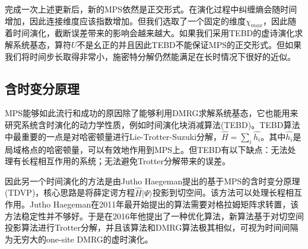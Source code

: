 \documentclass[12pt]{article}
\begin{document}
     完成一次上述更新后，新的MPS依然是正交形式。在演化过程中纠缠熵会随时间增加，因此连接维度应该指数增加。但我们选取了一个固定的维度$\chi_{max}$，因此随着时间演化，截断误差带来的影响会越来越大。如果我们采用TEBD的虚诗演化求解系统基态，算符$U$不是幺正的并且因此TEBD不能保证MPS的正交形式。但如果我们将时间步长取得非常小，施密特分解仍然能满足在长时情况下很好的近似。  
	
	
	  \subsection{含时变分原理}
	  MPS能够如此流行和成功的原因除了能够利用DMRG求解系统基态，它也能用来研究系统含时演化的动力学性质，例如时间演化块消减算法(TEBD)。TEBD算法中最重要的一点是对哈密顿量进行Lie-Trotter-Suzuki分解，$\hat{H}=\sum_i\hat{h_i}$。其中$\hat{h_i}$是局域格点的哈密顿量，可以有效地作用到MPS上。但TEBD有以下缺点：无法处理有长程相互作用的系统；无法避免Trotter分解带来的误差\cite{haegeman2011time}。
	  
	  因此另一个时间演化的方法是由Jutho Haegeman提出的基于MPS的含时变分原理(TDVP)，核心思路是将薛定谔方程$\hat{H}|\Psi\rangle$投影到切空间。该方法可以处理长程相互作用。Jutho Haegeman在2011年最开始提出的算法需要对格拉姆矩阵求转置，该方法稳定性并不够好。于是在2016年他提出了一种优化算法，新算法基于对切空间投影算法进行Trotter分解，并且该算法和DMRG算法极其相似，可视为时间间隔为无穷大的one-site DMRG的虚时演化\cite{haegeman2011time}。
	  
\end{document}
